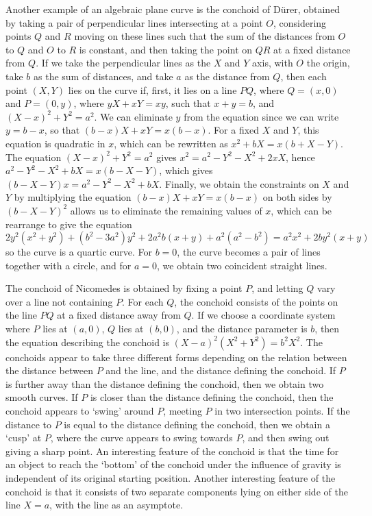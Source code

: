 \begin{example}
    Another example of an algebraic plane curve is the conchoid of D\"{u}rer, obtained by taking a pair of perpendicular lines intersecting at a point $O$, considering points $Q$ and $R$ moving on these lines such that the sum of the distances from $O$ to $Q$ and $O$ to $R$ is constant, and then taking the point on $QR$ at a fixed distance from $Q$. If we take the perpendicular lines as the $X$ and $Y$ axis, with $O$ the origin, take $b$ as the sum of distances, and take $a$ as the distance from $Q$, then each point $(X,Y)$ lies on the curve if, first, it lies on a line $PQ$, where $Q = (x,0)$ and $P = (0,y)$, where $yX + xY = xy$, such that $x + y = b$, and $(X - x)^2 + Y^2 = a^2$. We can eliminate $y$ from the equation since we can write $y = b -x$, so that $(b-x)X + xY = x(b-x)$. For a fixed $X$ and $Y$, this equation is quadratic in $x$, which can be rewritten as $x^2 + bX = x(b + X - Y)$. The equation $(X - x)^2 + Y^2 = a^2$ gives $x^2 = a^2 - Y^2 - X^2 + 2xX$, hence $a^2 - Y^2 - X^2 + bX = x(b - X - Y)$, which gives $(b - X - Y)x = a^2 - Y^2 - X^2 + bX$. Finally, we obtain the constraints on $X$ and $Y$ by multiplying the equation $(b - x)X + xY = x(b - x)$ on both sides by $(b - X - Y)^2$ allows us to eliminate the remaining values of $x$, which can be rearrange to give the equation
    \[ 2y^2(x^2 + y^2) + (b^2 - 3a^2)y^2 + 2a^2b(x + y) + a^2(a^2 - b^2) = a^2x^2 + 2by^2(x + y) \]
    so the curve is a quartic curve. For $b = 0$, the curve becomes a pair of lines together with a circle, and for $a = 0$, we obtain two coincident straight lines.
\end{example}

\begin{example}
    The conchoid of Nicomedes is obtained by fixing a point $P$, and letting $Q$ vary over a line not containing $P$. For each $Q$, the conchoid consists of the points on the line $PQ$ at a fixed distance away from $Q$. If we choose a coordinate system where $P$ lies at $(a,0)$, $Q$ lies at $(b,0)$, and the distance parameter is $b$, then the equation describing the conchoid is $(X - a)^2(X^2 + Y^2) = b^2X^2$. The conchoids appear to take three different forms depending on the relation between the distance between $P$ and the line, and the distance defining the conchoid. If $P$ is further away than the distance defining the conchoid, then we obtain two smooth curves. If $P$ is closer than the distance defining the conchoid, then the conchoid appears to `swing' around $P$, meeting $P$ in two intersection points. If the distance to $P$ is equal to the distance defining the conchoid, then we obtain a `cusp' at $P$, where the curve appears to swing towards $P$, and then swing out giving a sharp point. An interesting feature of the conchoid is that the time for an object to reach the `bottom' of the conchoid under the influence of gravity is independent of its original starting position. Another interesting feature of the conchoid is that it consists of two separate components lying on either side of the line $X = a$, with the line as an asymptote.
\end{example}

